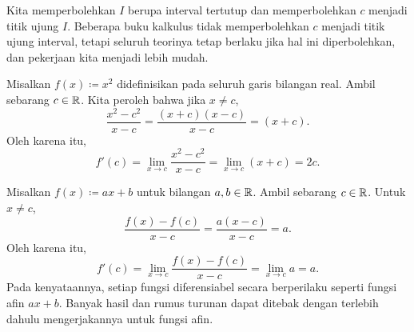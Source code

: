 \begin{myfigureht}
\caption{Interpretasi grafis turunan.\label{derivfig}}
\end{myfigureht}

Kita memperbolehkan $I$ berupa interval tertutup dan memperbolehkan
$c$ menjadi titik ujung $I$.  Beberapa buku kalkulus tidak memperbolehkan $c$ menjadi
titik ujung interval, tetapi seluruh teorinya tetap berlaku jika hal ini diperbolehkan,
dan pekerjaan kita menjadi lebih mudah.

\begin{example}
Misalkan $f(x) \coloneqq x^2$ didefinisikan pada seluruh garis bilangan real.  Ambil sebarang $c \in {\mathbb{R}}$.  Kita peroleh bahwa jika
$x \neq c$,
\begin{equation*}
\frac{x^2-c^2}{x-c} =
\frac{(x+c)(x-c)}{x-c} =
(x+c) .
\end{equation*}
Oleh karena itu,
\begin{equation*}
f'(c) = 
\lim_{x\to c} \frac{x^2-c^2}{x-c} =
\lim_{x\to c} (x+c) = 2c.
\end{equation*}
\end{example}

\begin{example}
Misalkan $f(x) \coloneqq ax + b$ untuk bilangan $a, b \in {\mathbb{R}}$.
Ambil sebarang $c \in {\mathbb{R}}$.
Untuk $x \neq c$,
\begin{equation*}
\frac{f(x)-f(c)}{x-c} =
\frac{a(x-c)}{x-c} = a .
\end{equation*}
Oleh karena itu,
\begin{equation*}
f'(c) =
\lim_{x\to c} 
\frac{f(x)-f(c)}{x-c} =
\lim_{x\to c} 
a = a.
\end{equation*}
Pada kenyataannya, setiap fungsi diferensiabel secara  berperilaku seperti
fungsi afin $ax + b$.  Banyak hasil
dan rumus turunan dapat ditebak dengan terlebih dahulu mengerjakannya untuk fungsi afin.
\end{example}


